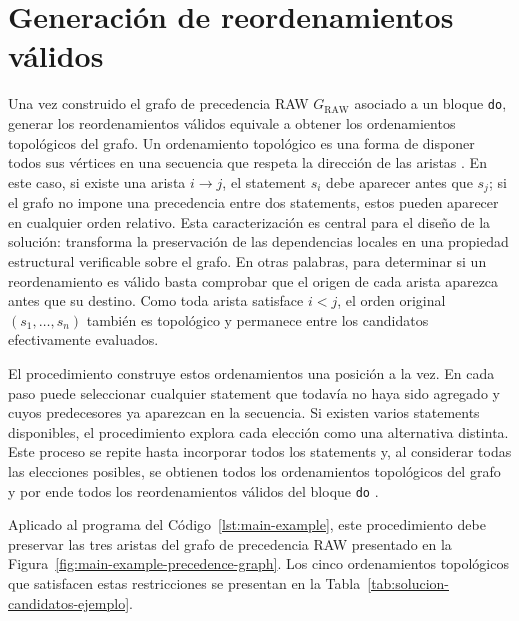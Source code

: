 
\section{Generación de reordenamientos válidos}
\label{sec:solucion-generacion-reordenamientos}

Una vez construido el grafo de precedencia RAW $G_{\mathrm{RAW}}$ asociado a un bloque \texttt{do}, generar los reordenamientos válidos equivale a obtener los ordenamientos topológicos del grafo. Un ordenamiento topológico es una forma de disponer todos sus vértices en una secuencia que respeta la dirección de las aristas \cite{Kahn1962}. En este caso, si existe una arista $i\to j$, el statement $s_i$ debe aparecer antes que $s_j$; si el grafo no impone una precedencia entre dos statements, estos pueden aparecer en cualquier orden relativo. Esta caracterización es central para el diseño de la solución: transforma la preservación de las dependencias locales en una propiedad estructural verificable sobre el grafo. En otras palabras, para determinar si un reordenamiento es válido basta comprobar que el origen de cada arista aparezca antes que su destino. Como toda arista satisface $i<j$, el orden original $(s_1,\ldots,s_n)$ también es topológico y permanece entre los candidatos efectivamente evaluados.

El procedimiento construye estos ordenamientos una posición a la vez. En cada paso puede seleccionar cualquier statement que todavía no haya sido agregado y cuyos predecesores ya aparezcan en la secuencia. Si existen varios statements disponibles, el procedimiento explora cada elección como una alternativa distinta. Este proceso se repite hasta incorporar todos los statements y, al considerar todas las elecciones posibles, se obtienen todos los ordenamientos topológicos del grafo y por ende todos los reordenamientos válidos del bloque \texttt{do} \cite{KnuthSzwarcfiter1974}.

Aplicado al programa del Código~\ref{lst:main-example}, este procedimiento debe preservar las tres aristas del grafo de precedencia RAW presentado en la Figura~\ref{fig:main-example-precedence-graph}. Los cinco ordenamientos topológicos que satisfacen estas restricciones se presentan en la Tabla~\ref{tab:solucion-candidatos-ejemplo}.

\begin{table}[ht]
\centering
\TableSetup
{}
\caption{Ordenamientos topológicos del grafo de precedencia RAW de la Figura~\ref{fig:main-example-precedence-graph}.}
\label{tab:solucion-candidatos-ejemplo}
\end{table}

